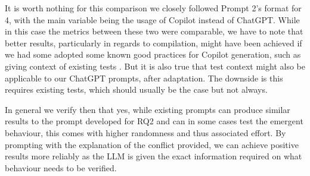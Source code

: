 It is worth nothing for this comparison we closely followed Prompt 2's format for 4, with the main variable being the usage of Copilot
instead of ChatGPT. While in this case the metrics between these two were comparable, we have to note that better results, particularly
in regards to compilation, might have been achieved if we had some adopted some known good practices for Copilot generation, such as giving
context of existing tests \citet{kn:githubcopilot}. But it is also true that test context might also be applicable to our ChatGPT prompts,
after adaptation. The downside is this requires existing tests, which should usually be the case but not always.

In general we verify then that yes, while existing prompts can produce similar results to the prompt developed for RQ2
and can in some cases test the emergent behaviour, this comes with higher randomness and thus associated effort.
By prompting with the explanation of the conflict provided, we can achieve positive results more reliably as the
LLM is given the exact information required on what behaviour needs to be verified.
